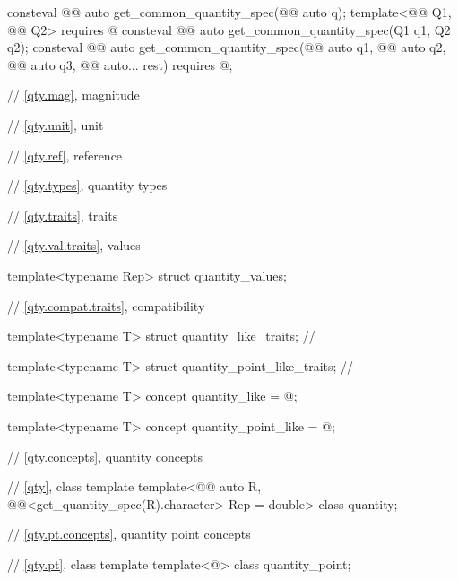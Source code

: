 \begin{codeblock}
{consteval @@ auto get_common_quantity_spec(@@ auto q);
template<@@ Q1, @@ Q2>
  requires @\seebelownc@
consteval @@ auto get_common_quantity_spec(Q1 q1, Q2 q2);
consteval @@ auto get_common_quantity_spec(@@ auto q1, @@ auto q2,
                                                     @@ auto q3,
                                                     @@ auto... rest)
  requires @\seebelownc@;

// \ref{qty.mag}, magnitude

// \ref{qty.unit}, unit

// \ref{qty.ref}, reference

// \ref{qty.types}, quantity types

// \ref{qty.traits}, traits

// \ref{qty.val.traits}, values

template<typename Rep>
struct quantity_values;

// \ref{qty.compat.traits}, compatibility

template<typename T>
struct quantity_like_traits; // \notdef

template<typename T>
struct quantity_point_like_traits; // \notdef

template<typename T>
concept quantity_like = @\seebelownc@;

template<typename T>
concept quantity_point_like = @\seebelownc@;

// \ref{qty.concepts}, quantity concepts

// \ref{qty}, class template 
template<@@ auto R, @@<get_quantity_spec(R).character> Rep = double>
class quantity;

// \ref{qty.pt.concepts}, quantity point concepts

// \ref{qty.pt}, class template 
template<@\unspec@>
class quantity_point;

}
\end{codeblock}

